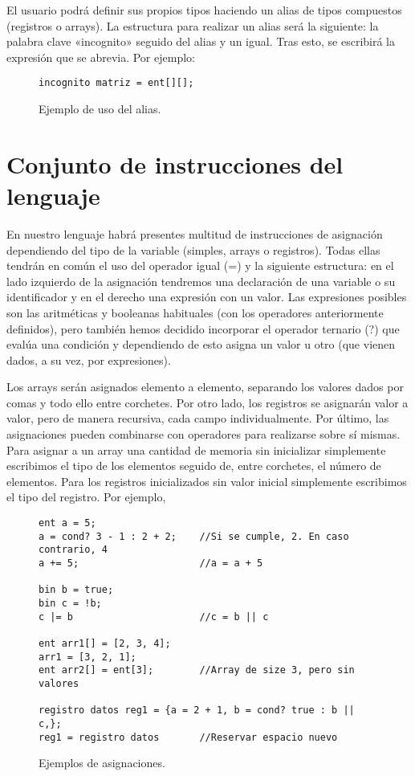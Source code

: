 El usuario podrá definir sus propios tipos haciendo un alias de tipos
compuestos (registros o arrays). La estructura para realizar un alias será la
siguiente: la palabra clave «incognito» seguido del alias y un igual. Tras esto,
se escribirá la expresión que se abrevia. Por ejemplo:
\begin{figure}[H]
    \centering
    \begin{lstlisting}
incognito matriz = ent[][];
    \end{lstlisting}
    \caption{Ejemplo de uso del alias.}
\end{figure}

\section*{Conjunto de instrucciones del lenguaje}
En nuestro lenguaje habrá presentes multitud de instrucciones de asignación
dependiendo del tipo de la variable (simples, arrays o registros). Todas ellas
tendrán en común el uso del operador igual (=) y la siguiente estructura: en el
lado izquierdo de la asignación tendremos una declaración de una variable o su
identificador y en el derecho una expresión con un valor. Las expresiones
posibles son las aritméticas y booleanas habituales (con los operadores
anteriormente definidos), pero también hemos decidido incorporar el operador
ternario (?) que evalúa una condición y dependiendo de esto asigna un valor u
otro (que vienen dados, a su vez, por expresiones). 

Los arrays serán asignados elemento a elemento, separando los valores dados por
comas y todo ello entre corchetes. Por otro lado, los registros se asignarán
valor a valor, pero de manera recursiva, cada campo individualmente. Por último,
las asignaciones pueden combinarse con operadores para realizarse sobre sí
mismas. Para asignar a un array una cantidad de memoria sin inicializar
simplemente escribimos el tipo de los elementos seguido de, entre corchetes, el
número de elementos. Para los registros inicializados sin valor inicial
simplemente escribimos el tipo del registro. Por ejemplo,
\begin{figure}[H]
    \centering
    \begin{lstlisting}
ent a = 5;
a = cond? 3 - 1 : 2 + 2;    //Si se cumple, 2. En caso contrario, 4
a += 5;                     //a = a + 5

bin b = true;
bin c = !b;
c |= b                      //c = b || c

ent arr1[] = [2, 3, 4];
arr1 = [3, 2, 1];
ent arr2[] = ent[3];        //Array de size 3, pero sin valores

registro datos reg1 = {a = 2 + 1, b = cond? true : b || c,};
reg1 = registro datos       //Reservar espacio nuevo
    \end{lstlisting}
    \caption{Ejemplos de asignaciones.}
\end{figure}

